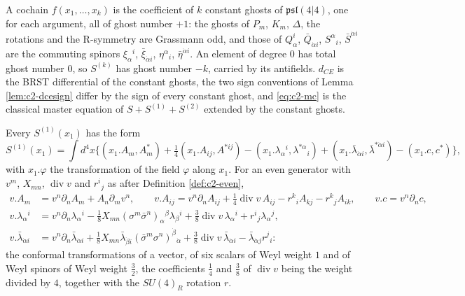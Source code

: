\begin{remark}
A cochain $f(x_1,\dots,x_k)$ is the coefficient of $k$ constant ghosts of $\mathfrak{psl}(4|4)$, one for each argument, all of ghost number $+1$: the ghosts of $P_m$, $K_m$, $\Delta$, the rotations and the R-symmetry are Grassmann odd, and those of $Q^i_\alpha$, $\bar Q_{\dot\alpha i}$, $S^\alpha{}_i$, $\bar S^{\dot\alpha i}$ are the commuting spinors $\xi_\alpha{}^i$, $\bar\xi_{\dot\alpha i}$, $\eta^\alpha{}_i$, $\bar\eta^{\dot\alpha i}$. An element of degree $0$ has total ghost number $0$, so $S^{(k)}$ has ghost number $-k$, carried by its antifields. $d_{CE}$ is the BRST differential of the constant ghosts, the two sign conventions of Lemma \ref{lem:c2-dcesign} differ by the sign of every constant ghost, and \eqref{eq:c2-mc} is the classical master equation of $S+S^{(1)}+S^{(2)}$ extended by the constant ghosts.
\end{remark}

\begin{remark}
Every $S^{(1)}(x_1)$ has the form
\[
S^{(1)}(x_1)=\int d^4x\Big\{(x_1.A_m,A^*_m)+\tfrac14(x_1.A_{ij},A^{*ij})-(x_1.\lambda_\alpha{}^i,\lambda^{*\alpha}{}_i)+(x_1.\bar\lambda_{\dot\alpha i},\bar\lambda^{*\dot\alpha i})-(x_1.c,c^*)\Big\},
\]
with $x_1.\varphi$ the transformation of the field $\varphi$ along $x_1$. For an even generator with $v^m$, $X_{mn}$, $\operatorname{div}v$ and $r^i{}_j$ as after Definition \ref{def:c2-even},
\[
\begin{aligned}
v.A_m&=v^n\partial_nA_m+A_n\partial_mv^n,\qquad v.A_{ij}=v^n\partial_nA_{ij}+\tfrac14\operatorname{div}v\,A_{ij}-r^k{}_iA_{kj}-r^k{}_jA_{ik},\qquad v.c=v^n\partial_nc,\\
v.\lambda_\alpha{}^i&=v^n\partial_n\lambda_\alpha{}^i-\tfrac18X_{mn}(\sigma^m\bar\sigma^n)_\alpha{}^\beta\lambda_\beta{}^i+\tfrac38\operatorname{div}v\,\lambda_\alpha{}^i+r^i{}_j\lambda_\alpha{}^j,\\
v.\bar\lambda_{\dot\alpha i}&=v^n\partial_n\bar\lambda_{\dot\alpha i}+\tfrac18X_{mn}\bar\lambda_{\dot\beta i}(\bar\sigma^m\sigma^n)^{\dot\beta}{}_{\dot\alpha}+\tfrac38\operatorname{div}v\,\bar\lambda_{\dot\alpha i}-\bar\lambda_{\dot\alpha j}r^j{}_i :
\end{aligned}
\]
the conformal transformations of a vector, of six scalars of Weyl weight $1$ and of Weyl spinors of Weyl weight $\tfrac32$, the coefficients $\tfrac14$ and $\tfrac38$ of $\operatorname{div}v$ being the weight divided by $4$, together with the $SU(4)_R$ rotation $r$.
\end{remark}

